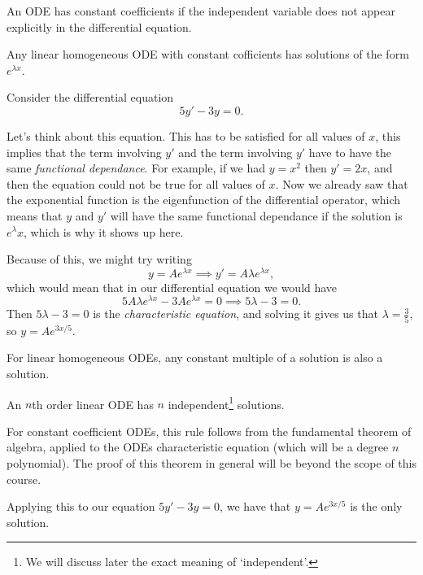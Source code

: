 \documentclass[a4paper]{scrreprt}
\begin{document}
\begin{definition}
	An ODE has constant coefficients if the independent variable does not appear explicitly in the differential equation.
\end{definition}

\begin{proposition}
	Any linear homogeneous ODE with constant cofficients has solutions of the form $e^{\lambda x}$.
\end{proposition}

\begin{example}
	Consider the differential equation
	$$
5y' - 3y = 0.
	$$
\end{example}
Let's think about this equation. This has to be satisfied for all values of $x$, this implies that the term involving $y'$ and the term involving $y'$ have to have the same \emph{functional dependance}. For example, if we had $y = x^2$ then $y' = 2x$, and then the equation could not be true for all values of $x$. Now we already saw that the exponential function is the eigenfunction of the differential operator, which means that $y$ and $y'$ will have the same functional dependance if the solution is $e^{\lambda} x$, which is why it shows up here.

Because of this, we might try writing
$$
y = Ae^{\lambda x} \implies y' = A \lambda e^{\lambda x},
$$
which would mean that in our differential equation we would have
$$
5A\lambda e^{\lambda x} - 3 A e^{\lambda x} = 0 \implies 5\lambda - 3 = 0.
$$
Then $5 \lambda - 3 = 0$ is the \emph{characteristic equation}, and solving it gives us that $\lambda = \frac{3}{5}$, so $y = Ae^{3x/5}$.

\begin{proposition}
	For linear homogeneous ODEs, any constant multiple of a solution is also a solution.
\end{proposition}

\begin{proposition}
	An $n$th order linear ODE has $n$ independent\footnote{We will discuss later the exact meaning of `independent'.} solutions.
\end{proposition}

For constant coefficient ODEs, this rule follows from the fundamental theorem of algebra, applied to the ODEs characteristic equation (which will be a degree $n$ polynomial). The proof of this theorem in general will be beyond the scope of this course.

Applying this to our equation $5y' - 3y = 0$, we have that $y = Ae^{3x/5}$ is the only solution.
\end{document}
